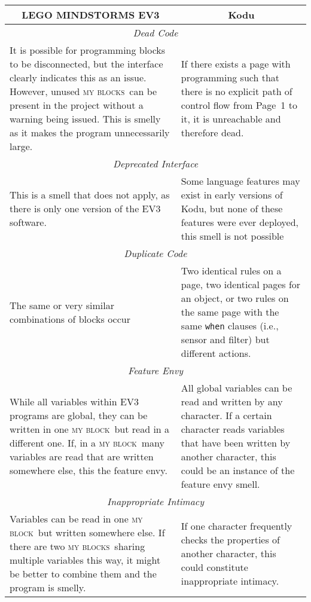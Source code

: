 \documentclass[conference]{IEEEtran}
\newcommand{\ms}{LEGO MINDSTORMS EV3}
\newcommand{\mbs}{\textsc{my blocks}}
\newcommand{\mb}{\textsc{my block}}
\begin{document}
\begin{table*}
\caption{Smell definitions for \ms~and Kodu \label{smelldefs}}
\begin{tabular}{ p{3.38in}  p{3.37in} } 
\multicolumn{1}{c}{\textbf{\ms}} & \multicolumn{1}{c}{\textbf{Kodu}} \\ \bottomrule
\multicolumn{2}{c}{\emph{Dead Code}} \\ \hline
 It is possible for programming blocks to be disconnected, but the interface clearly indicates this as an issue. However, unused \mbs~can be present in the project without a warning being issued. This is smelly as it makes the program unnecessarily large.  & If there exists a page with programming such that there is no explicit path of control flow from Page~1 to it, it is unreachable and therefore dead. \\ \bottomrule
\multicolumn{2}{c}{ \emph{Deprecated Interface}}\\ \hline
This is a smell that does not apply, as there is only one version of the EV3 software. 
&Some language features may exist in early versions of Kodu, but none of these features were ever deployed, this smell is not possible\\ \bottomrule
\multicolumn{2}{c}{ \emph{Duplicate Code}} \\ \hline
The same or very similar combinations of blocks occur
&Two identical rules on a page,  two identical pages for an object, or two rules on the same page with the same {\tt when} clauses (i.e., sensor and filter) but different actions. \\ \bottomrule
\multicolumn{2}{c}{ \emph{Feature Envy}} \\ \hline
While all variables within EV3 programs are global, they can be written in one \mb~but read in a different one. If, in a \mb~many variables are read that are written somewhere else, this the feature envy. 
& All global variables can be read and written by any character. If a certain character reads variables that have been written by another character, this could be an instance of the feature envy smell.\\ \bottomrule
\multicolumn{2}{c}{ \emph{Inappropriate Intimacy}} \\ \hline
Variables can be read in one \mb~but written somewhere else. If there are two \mbs~sharing multiple variables this way, it might be better to combine them and the program is smelly. 
& If one character frequently checks the properties of another character, this could constitute inappropriate intimacy.\\ \bottomrule

\end{tabular}
\end{table*}
\end{document}
